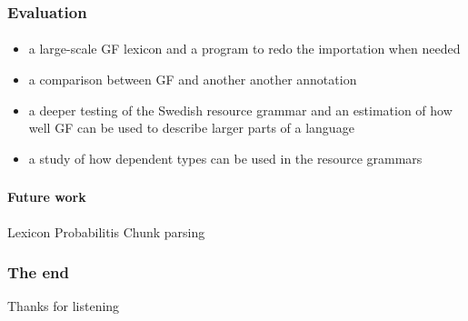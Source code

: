 \documentclass[10pt]{beamer}
\renewcommand{\baselinestretch}{1.5}
\begin{document}
%
%
%

\begin{frame}
 \renewcommand{\baselinestretch}{1.0}
\frametitle{Evaluation}
\framesubtitle{} 
\begin{itemize}
\item a large-scale GF lexicon and a program to redo the importation when needed
\item a comparison between GF and another another annotation
\item a deeper testing of the Swedish resource grammar and an estimation
of how well GF can be used to describe larger parts of a language
\item a study of how dependent types can be used in the resource grammars
\end{itemize}
\end{frame}



\begin{frame}
 \renewcommand{\baselinestretch}{1.0}
\frametitle{}
\framesubtitle{Future work} 
Lexicon
Probabilitis
Chunk parsing
\end{frame}

\begin{frame}
    \frametitle{The end}
\large\begin{center}Thanks for listening\end{center}
\end{frame}
\end{document}
